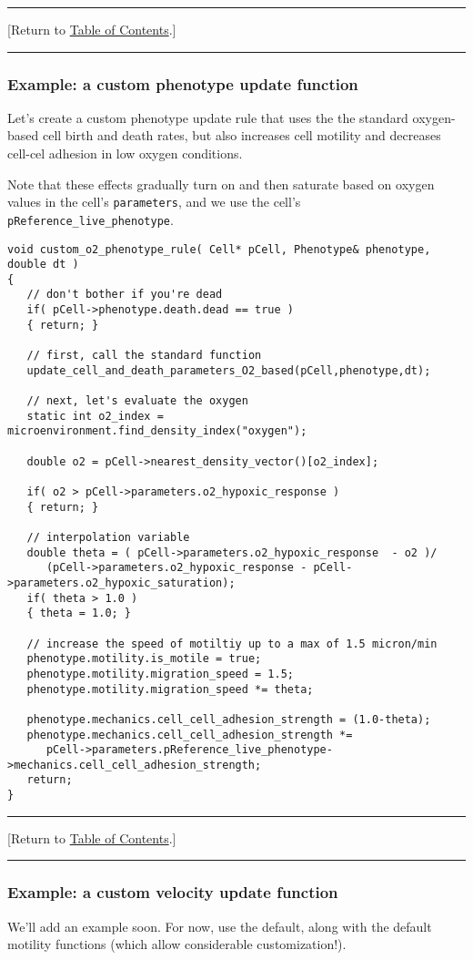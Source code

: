 \documentclass[12pt]{article}
\renewcommand{\v}{\verb}
\newcommand{\TOClink}{\begin{center}\hrule\vskip-5pt\phantom{.}\hfill[Return to \hyperlink{TOC}{Table of Contents}.]\hfill\phantom{.}\vskip3pt\hrule\end{center}}
\begin{document}
\TOClink 

\subsubsection{Example: a custom phenotype update function}
\label{sec:Examples:phenotype_rule}
Let's create a custom phenotype update rule that uses the 
the standard oxygen-based cell birth and death rates, but 
also increases cell motility and decreases cell-cel adhesion 
in low oxygen conditions. 

Note that these effects gradually turn on and then saturate 
based on oxygen values in the cell's \v|parameters|, 
and we use the cell's \v|pReference_live_phenotype|.  
\begin{verbatim}
void custom_o2_phenotype_rule( Cell* pCell, Phenotype& phenotype, double dt )
{
   // don't bother if you're dead
   if( pCell->phenotype.death.dead == true )
   { return; }
   
   // first, call the standard function
   update_cell_and_death_parameters_O2_based(pCell,phenotype,dt);     
    
   // next, let's evaluate the oxygen 
   static int o2_index = microenvironment.find_density_index("oxygen"); 
   
   double o2 = pCell->nearest_density_vector()[o2_index];
    
   if( o2 > pCell->parameters.o2_hypoxic_response )
   { return; }
    
   // interpolation variable 
   double theta = ( pCell->parameters.o2_hypoxic_response  - o2 )/
      (pCell->parameters.o2_hypoxic_response - pCell->parameters.o2_hypoxic_saturation); 
   if( theta > 1.0 )
   { theta = 1.0; } 
    
   // increase the speed of motiltiy up to a max of 1.5 micron/min 
   phenotype.motility.is_motile = true; 
   phenotype.motility.migration_speed = 1.5; 
   phenotype.motility.migration_speed *= theta;  

   phenotype.mechanics.cell_cell_adhesion_strength = (1.0-theta);
   phenotype.mechanics.cell_cell_adhesion_strength *= 
      pCell->parameters.pReference_live_phenotype->mechanics.cell_cell_adhesion_strength;
   return; 
}
\end{verbatim}
\TOClink 

\subsubsection{Example: a custom velocity update function}
We'll add an example soon. For now, use the default, along with the 
default motility functions (which allow considerable customization!). 
\end{document}
